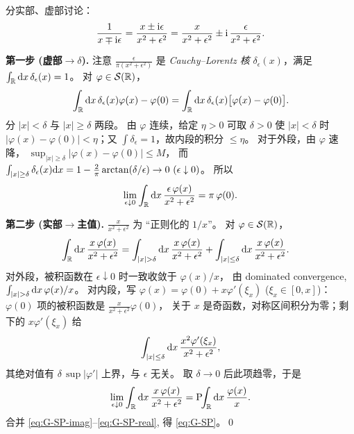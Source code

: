 \begin{proof*}
分实部、虚部讨论：
\begin{equation}
  \frac{1}{x\mp\mathrm{i}\epsilon}
  = \frac{x\pm\mathrm{i}\epsilon}{x^2+\epsilon^2}
  = \frac{x}{x^2+\epsilon^2}
    \pm \mathrm{i}\,\frac{\epsilon}{x^2+\epsilon^2}.
\end{equation}

\textbf{第一步 (虚部$\to$$\delta$).}
注意
$\displaystyle\frac{\epsilon}{\pi(x^2+\epsilon^2)}$
是 \emph{Cauchy--Lorentz 核} $\delta_\epsilon(x)$，满足
$\int_{\mathbb{R}}\mathrm{d} x\,\delta_\epsilon(x)=1$。
对 $\varphi\in\mathcal S(\mathbb{R})$，
\begin{equation}
  \int_{\mathbb{R}}\mathrm{d} x\,\delta_\epsilon(x)\varphi(x)
  - \varphi(0)
  = \int_{\mathbb{R}}\mathrm{d} x\,\delta_\epsilon(x)
    \bigl[\varphi(x)-\varphi(0)\bigr].
\end{equation}
分 $|x|<\delta$ 与 $|x|\geq\delta$ 两段。
由 $\varphi$ 连续，给定 $\eta>0$ 可取 $\delta>0$ 使 $|x|<\delta$ 时
$|\varphi(x)-\varphi(0)|<\eta$；又 $\int\delta_\epsilon=1$，故内段的积分 $\leq\eta$。
对于外段，由 $\varphi$ 速降，
$\sup_{|x|\geq\delta}|\varphi(x)-\varphi(0)|\leq M$，
而 $\int_{|x|\geq\delta}\delta_\epsilon(x)\mathrm{d} x
= 1-\frac{2}{\pi}\arctan(\delta/\epsilon)\to 0\ (\epsilon\downarrow 0)$。
所以
\begin{equation}\label{eq:G-SP-imag}
  \lim_{\epsilon\downarrow 0}\int_{\mathbb{R}}\mathrm{d} x\,
  \frac{\epsilon\,\varphi(x)}{x^2+\epsilon^2}
  = \pi\,\varphi(0).
\end{equation}

\textbf{第二步 (实部$\to$主值).}
$\displaystyle\frac{x}{x^2+\epsilon^2}$ 为 ``正则化的 $1/x$''。
对 $\varphi\in\mathcal S(\mathbb{R})$，
\begin{align}
  \int_{\R}\rmd x\,\frac{x\,\varphi(x)}{x^2+\epsilon^2}
  &= \int_{|x|>\delta}\rmd x\,\frac{x\,\varphi(x)}{x^2+\epsilon^2}
   + \int_{|x|\leq\delta}\rmd x\,\frac{x\,\varphi(x)}{x^2+\epsilon^2}.
\end{align}
对外段，被积函数在 $\epsilon\downarrow 0$ 时一致收敛于 $\varphi(x)/x$，
由 dominated convergence,
$\int_{|x|>\delta}\rmd x\,\varphi(x)/x$。
对内段，写 $\varphi(x)=\varphi(0)+x\varphi'(\xi_x)$ ($\xi_x\in[0,x]$)：
$\varphi(0)$ 项的被积函数是 $\frac{x}{x^2+\epsilon^2}\varphi(0)$，
关于 $x$ 是奇函数，对称区间积分为零；剩下的 $x\varphi'(\xi_x)$ 给
\begin{equation}
  \int_{|x|\leq\delta}\mathrm{d} x\,\frac{x^2\varphi'(\xi_x)}{x^2+\epsilon^2},
\end{equation}
其绝对值有 $\delta\,\sup|\varphi'|$ 上界，与 $\epsilon$ 无关。
取 $\delta\to 0$ 后此项趋零，于是
\begin{equation}\label{eq:G-SP-real}
  \lim_{\epsilon\downarrow 0}\int_{\mathbb{R}}\mathrm{d} x\,\frac{x\,\varphi(x)}{x^2+\epsilon^2}
  = \mathrm{P}\!\!\int_{\mathbb{R}}\mathrm{d} x\,\frac{\varphi(x)}{x}.
\end{equation}
合并 \eqref{eq:G-SP-imag}--\eqref{eq:G-SP-real}, 得 \eqref{eq:G-SP}。\qed
\end{proof*}

